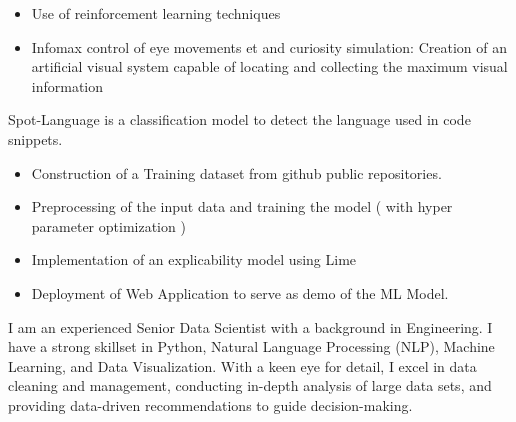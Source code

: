 \documentclass[10pt,letter,ragged2e,withhyper]{altacv}
\renewcommand{\divider}{\vspace{-0.2cm}\textcolor{body!30}{\hdashrule{\linewidth}{0.6pt}{0.5ex}}\smallskip\vspace{-0.1cm}} %
\begin{document}
\begin{paracol}{2}
\begin{itemize}
  \item Use of reinforcement learning techniques
  \item Infomax control of eye movements et and curiosity simulation: Creation of an artificial visual system capable of locating and collecting the maximum visual information
\end{itemize}





Spot-Language is a classification model to detect the language used in code snippets.

\begin{itemize}
      \item Construction of a Training dataset from github public repositories.
      \item Preprocessing of the input data and training the model ( with hyper parameter optimization )
      \item Implementation of an explicability model using Lime
      \item Deployment of Web Application to serve as demo of the ML Model.
  \end{itemize}

\divider
{}





\switchcolumn
{}
{\small
I am an experienced Senior Data Scientist with a background in Engineering.
I have a strong skillset in Python, Natural Language Processing (NLP), Machine
Learning, and Data Visualization. With a keen eye for detail, I excel in data
cleaning and management, conducting in-depth analysis of large data sets, and
providing data-driven recommendations to guide decision-making. 

}


\end{paracol}
\end{document}

